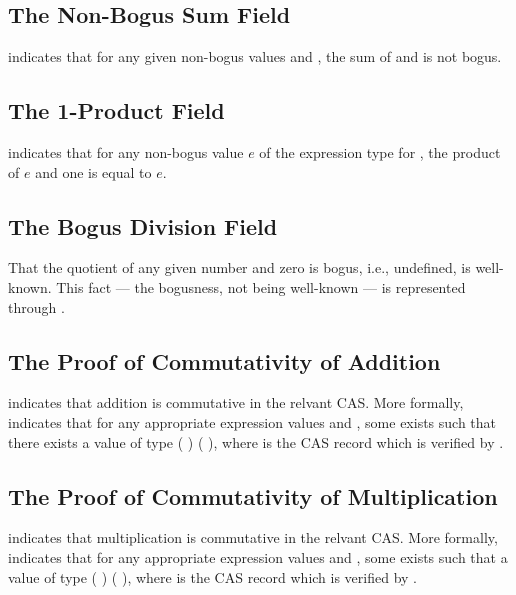 \documentclass{report}
\begin{document}
\subsection{The Non-Bogus Sum Field}
 indicates that for any given non-bogus values  and , the sum of  and  is not bogus.

\subsection{The 1-Product Field}
  indicates that for any non-bogus value \(e\) of the expression type for , the product of \(e\) and one is equal to \(e\).

\subsection{The Bogus Division Field}
That the quotient of any given number and zero is bogus, i.e., undefined, is well-known.  This fact --- the bogusness, not being well-known --- is represented through .

\subsection{The Proof of Commutativity of Addition}
 indicates that addition is commutative in the relvant CAS.  More formally,   indicates that for any appropriate expression values  and , some  exists such that there exists a value of type   \AgdaSymbol(   \AgdaSymbol) \AgdaSymbol(   \AgdaSymbol), where  is the CAS record which is verified by .

\subsection{The Proof of Commutativity of Multiplication}
 indicates that multiplication is commutative in the relvant CAS.  More formally,   indicates that for any appropriate expression values  and , some  exists such that a value of type   \AgdaSymbol(   \AgdaSymbol) \AgdaSymbol(   \AgdaSymbol), where  is the CAS record which is verified by .
\end{document}
